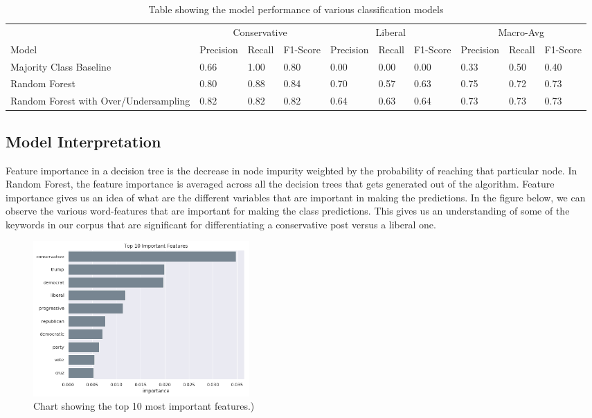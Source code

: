 \documentclass[conference]{IEEEtran}
\begin{document}
\begin{table}[tb]
  \footnotesize
  \centering
    \caption{Table showing the model performance of various classification models}
  \label{Tab:ClassificationTab1}
  \vspace{-2mm}
  \begin{tabular}{llllllllll}
    & \multicolumn{3}{c}{Conservative} & \multicolumn{3}{c}{Liberal}   & \multicolumn{3}{c}{Macro-Avg} \\
    Model                                 & Precision  & Recall  & F1-Score  & Precision & Recall & F1-Score & Precision & Recall & F1-Score \\
    Majority Class Baseline               & 0.66       & 1.00    & 0.80      & 0.00      & 0.00   & 0.00     & 0.33      & 0.50   & 0.40     \\
    Random Forest                         & 0.80       & 0.88    & 0.84      & 0.70      & 0.57   & 0.63     & 0.75      & 0.72   & 0.73     \\
    Random Forest with Over/Undersampling & 0.82       & 0.82    & 0.82      & 0.64      & 0.63   & 0.64     & 0.73      & 0.73   & 0.73    
\end{tabular}
\vspace{-7mm}
\end{table}

\subsection{Model Interpretation}
Feature importance in a decision tree is the decrease in node impurity weighted by the probability of reaching that particular node. In Random Forest, the feature importance is averaged across all the decision trees that gets generated out of the algorithm. Feature importance gives us an idea of what are the different variables that are important in making the predictions. In the figure below, we can observe the various word-features that are important for making the class predictions. This gives us an understanding of some of the keywords in our corpus that are significant for differentiating a conservative post versus a liberal one.

\begin{figure}[tb]
    \centering
    \includegraphics[width=0.4\textwidth]{feat_importance.pdf}
    \vspace{-2mm}
    \caption{Chart showing the top 10 most important features.)}
    \label{fig:feat_importance}
    \vspace{-5mm}
\end{figure}
\end{document}

